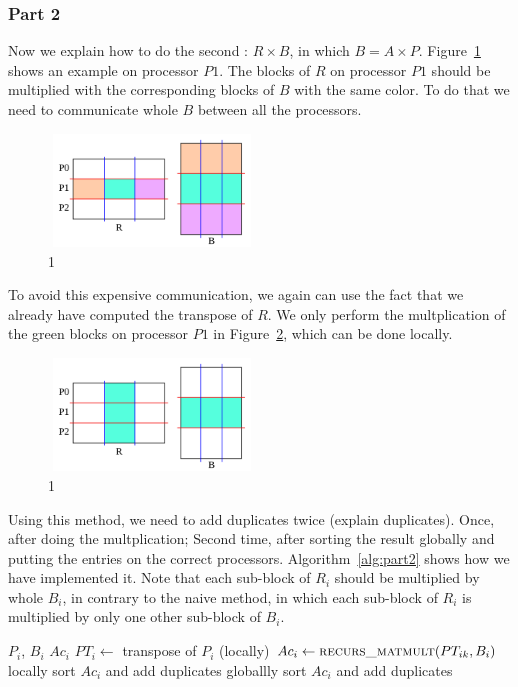 \subsubsection{Part 2}

Now we explain how to do the second \mm: $R \times B$, in which $B = A \times P$. Figure~\ref{fig:part2d} shows an example on processor $P1$. The blocks of $R$ on processor $P1$ should be multiplied with the corresponding blocks of $B$ with the same color. To do that we need to communicate whole $B$ between all the processors.

\begin{figure}[tbh]
 \centering
 \includegraphics[width=5.5cm,height=3cm]{./figures/part2d.pdf}
 \caption{1}
 \label{fig:part2d}
\end{figure}

To avoid this expensive communication, we again can use the fact that we already have computed the transpose of $R$. We only perform the multplication of the green blocks on processor $P1$ in Figure~\ref{fig:part2e}, which can be done locally.

\begin{figure}[tbh]
 \centering
 \includegraphics[width=5.5cm,height=3cm]{./figures/part2e.pdf}
 \caption{1}
 \label{fig:part2e}
\end{figure}

Using this method, we need to add duplicates twice (explain duplicates). Once, after doing the multplication; Second time, after sorting the result globally and putting the entries on the correct processors. Algorithm~\ref{alg:part2} shows how we have implemented it. Note that each sub-block of $R_i$ should be multiplied by whole $B_i$, in contrary to the naive method, in which each sub-block of $R_i$ is multiplied by only one other sub-block of $B_i$.

\begin{algorithm}[H] 
  \caption{Part 2: $Ac = R \times B$} \label{alg:part2} 
  \begin{algorithmic}[1]
    \Require $P_i$, $B_i$
    \Ensure  $Ac_i$
    \State $PT_i \leftarrow$ transpose of $P_i$ (locally)
      \State $Ac_i \leftarrow \textsc{recurs\_matmult}(PT_{ik}, B_i)$
    \EndFor
    \State locally sort $Ac_i$ and add duplicates
    \State globallly sort $Ac_i$ and add duplicates
  \end{algorithmic}
\end{algorithm}
